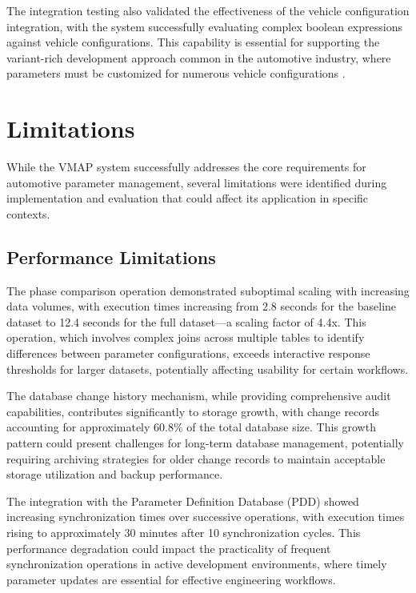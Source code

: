 The integration testing also validated the effectiveness of the vehicle configuration integration, with the system successfully evaluating complex boolean expressions against vehicle configurations. This capability is essential for supporting the variant-rich development approach common in the automotive industry, where parameters must be customized for numerous vehicle configurations \cite{staron2021autosar}.

\section{Limitations}
\label{sec:limitations}

While the VMAP system successfully addresses the core requirements for automotive parameter management, several limitations were identified during implementation and evaluation that could affect its application in specific contexts.

\subsection{Performance Limitations}
\label{subsec:performance-limitations}

The phase comparison operation demonstrated suboptimal scaling with increasing data volumes, with execution times increasing from 2.8 seconds for the baseline dataset to 12.4 seconds for the full dataset—a scaling factor of 4.4x. This operation, which involves complex joins across multiple tables to identify differences between parameter configurations, exceeds interactive response thresholds for larger datasets, potentially affecting usability for certain workflows.

The database change history mechanism, while providing comprehensive audit capabilities, contributes significantly to storage growth, with change records accounting for approximately 60.8\% of the total database size. This growth pattern could present challenges for long-term database management, potentially requiring archiving strategies for older change records to maintain acceptable storage utilization and backup performance.

The integration with the Parameter Definition Database (PDD) showed increasing synchronization times over successive operations, with execution times rising to approximately 30 minutes after 10 synchronization cycles. This performance degradation could impact the practicality of frequent synchronization operations in active development environments, where timely parameter updates are essential for effective engineering workflows.

